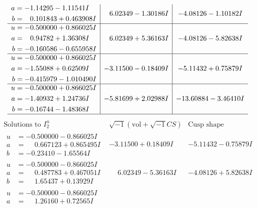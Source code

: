 \documentclass[1p]{elsarticle_modified}
\theoremstyle{definition}
\newcommand{\I}{\sqrt{-1}}
\begin{document}
$$\begin{array}{c|c|c}
\begin{aligned}
a &= -1.14295 - 1.11541 I \\
b &= \phantom{-}0.101843 + 0.463908 I\end{aligned}
 & \phantom{-}6.02349 - 1.30186 I & -4.08126 - 1.10182 I \\ \hline\begin{aligned}
u &= -0.500000 + 0.866025 I \\
a &= \phantom{-}0.94782 + 1.36308 I \\
b &= -0.160586 - 0.655958 I\end{aligned}
 & \phantom{-}6.02349 + 5.36163 I & -4.08126 - 5.82638 I \\ \hline\begin{aligned}
u &= -0.500000 + 0.866025 I \\
a &= -1.55088 + 0.62509 I \\
b &= -0.415979 - 1.010490 I\end{aligned}
 & -3.11500 - 0.18409 I & -5.11432 + 0.75879 I \\ \hline\begin{aligned}
u &= -0.500000 + 0.866025 I \\
a &= -1.40932 + 1.24736 I \\
b &= -0.16744 - 1.48368 I\end{aligned}
 & -5.81699 + 2.02988 I & -13.60884 - 3.46410 I\\
 \hline 
 \end{array}$$\newpage$$\begin{array}{c|c|c}  
\text{Solutions to }I^u_{2}& \I (\text{vol} + \sqrt{-1}CS) & \text{Cusp shape}\\
 \hline 
\begin{aligned}
u &= -0.500000 - 0.866025 I \\
a &= \phantom{-}0.667123 + 0.865495 I \\
b &= -0.23410 - 1.65564 I\end{aligned}
 & -3.11500 + 0.18409 I & -5.11432 - 0.75879 I \\ \hline\begin{aligned}
u &= -0.500000 - 0.866025 I \\
a &= \phantom{-}0.487783 + 0.467051 I \\
b &= \phantom{-}1.65437 + 0.13929 I\end{aligned}
 & \phantom{-}6.02349 - 5.36163 I & -4.08126 + 5.82638 I \\ \hline\begin{aligned}
u &= -0.500000 - 0.866025 I \\
a &= \phantom{-}1.26160 + 0.72565 I \\

\end{aligned}
\end{array}$$
\end{document}
